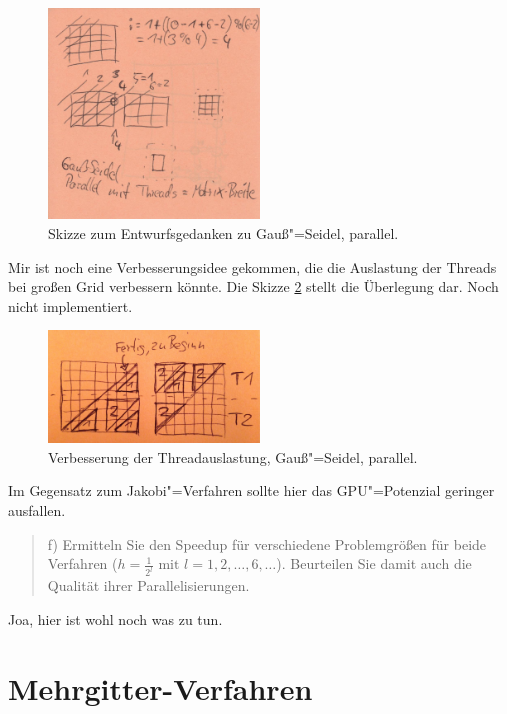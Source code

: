 \documentclass[paper = a4]{scrartcl}
\begin{document}
\begin{figure}
    \centering
    \includegraphics[width=0.5\textwidth]{gaussseidelskizze}
    \caption{Skizze zum Entwurfsgedanken zu Gauß"=Seidel, parallel.}
    \label{fig:gaussseidelskizze}
\end{figure}

Mir ist noch eine Verbesserungsidee gekommen, die die Auslastung der Threads bei großen Grid verbessern könnte. Die Skizze \ref{fig:gaussseideldreiecke} stellt die Überlegung dar. Noch nicht implementiert.

\begin{figure}
    \centering
    \includegraphics[width=0.5\textwidth]{gaussseideldreiecke}
    \caption{Verbesserung der Threadauslastung, Gauß"=Seidel, parallel.}
    \label{fig:gaussseideldreiecke}
\end{figure}

Im Gegensatz zum Jakobi"=Verfahren sollte hier das GPU"=Potenzial geringer ausfallen.

\begin{quote}
    f) Ermitteln Sie den Speedup für verschiedene Problemgrößen für beide Verfahren (\(h = \frac{1}{2^l} \text{ mit } l = 1, 2, \dots, 6, \dots\)). Beurteilen Sie damit auch die Qualität ihrer Parallelisierungen.
\end{quote}

Joa, hier ist wohl noch was zu tun.


\section{Mehrgitter-Verfahren}
\end{document}
